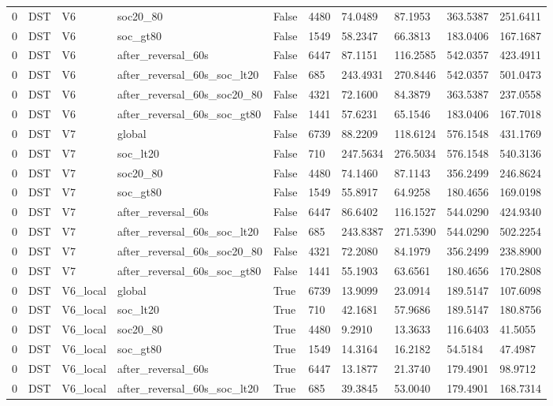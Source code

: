 \begin{tabular}{llllllllll}
0 & DST & V6 & soc20\_80 & False & 4480 & 74.0489 & 87.1953 & 363.5387 & 251.6411 \\
0 & DST & V6 & soc\_gt80 & False & 1549 & 58.2347 & 66.3813 & 183.0406 & 167.1687 \\
0 & DST & V6 & after\_reversal\_60s & False & 6447 & 87.1151 & 116.2585 & 542.0357 & 423.4911 \\
0 & DST & V6 & after\_reversal\_60s\_soc\_lt20 & False & 685 & 243.4931 & 270.8446 & 542.0357 & 501.0473 \\
0 & DST & V6 & after\_reversal\_60s\_soc20\_80 & False & 4321 & 72.1600 & 84.3879 & 363.5387 & 237.0558 \\
0 & DST & V6 & after\_reversal\_60s\_soc\_gt80 & False & 1441 & 57.6231 & 65.1546 & 183.0406 & 167.7018 \\
0 & DST & V7 & global & False & 6739 & 88.2209 & 118.6124 & 576.1548 & 431.1769 \\
0 & DST & V7 & soc\_lt20 & False & 710 & 247.5634 & 276.5034 & 576.1548 & 540.3136 \\
0 & DST & V7 & soc20\_80 & False & 4480 & 74.1460 & 87.1143 & 356.2499 & 246.8624 \\
0 & DST & V7 & soc\_gt80 & False & 1549 & 55.8917 & 64.9258 & 180.4656 & 169.0198 \\
0 & DST & V7 & after\_reversal\_60s & False & 6447 & 86.6402 & 116.1527 & 544.0290 & 424.9340 \\
0 & DST & V7 & after\_reversal\_60s\_soc\_lt20 & False & 685 & 243.8387 & 271.5390 & 544.0290 & 502.2254 \\
0 & DST & V7 & after\_reversal\_60s\_soc20\_80 & False & 4321 & 72.2080 & 84.1979 & 356.2499 & 238.8900 \\
0 & DST & V7 & after\_reversal\_60s\_soc\_gt80 & False & 1441 & 55.1903 & 63.6561 & 180.4656 & 170.2808 \\
0 & DST & V6\_local & global & True & 6739 & 13.9099 & 23.0914 & 189.5147 & 107.6098 \\
0 & DST & V6\_local & soc\_lt20 & True & 710 & 42.1681 & 57.9686 & 189.5147 & 180.8756 \\
0 & DST & V6\_local & soc20\_80 & True & 4480 & 9.2910 & 13.3633 & 116.6403 & 41.5055 \\
0 & DST & V6\_local & soc\_gt80 & True & 1549 & 14.3164 & 16.2182 & 54.5184 & 47.4987 \\
0 & DST & V6\_local & after\_reversal\_60s & True & 6447 & 13.1877 & 21.3740 & 179.4901 & 98.9712 \\
0 & DST & V6\_local & after\_reversal\_60s\_soc\_lt20 & True & 685 & 39.3845 & 53.0040 & 179.4901 & 168.7314 \\

\end{tabular}
